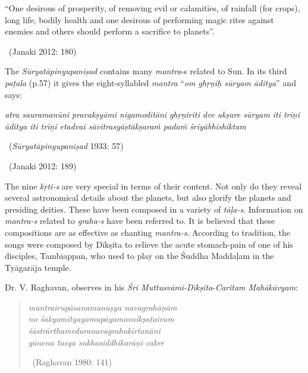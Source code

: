 \begin{myquote}
“One desirous of prosperity, of removing evil or calamities, of rainfall (for crops), long life, bodily health and one desirous of performing magic rites against enemies and others should perform a sacrifice to planets”.

~\hfill (Janaki 2012: 180)
\end{myquote}

The \textit{Sūryatāpinyupaniṣad} contains many \textit{mantra}-s related to Sun. In its third \textit{paṭala} (p.57) it gives the eight-syllabled \textit{mantra} “\textit{om ghṛṇiḥ sūryam āditya}” and says:

\begin{myquote}
\textit{atra sauramanūni pravakṣyāmi nigamoditāni  ghṛṇiriti dve akṣare  sūryam iti trīṇi  āditya iti trīṇi  etadvai sāvitrasyāṣtākṣaraṁ padaṁ śriyābhishiktam } 

~\hfill (\textit{Sūryatāpinyupaniṣad} 1933: 57)
\end{myquote}

\vspace{-.1cm}

\begin{myquote}

~\hfill (Janaki 2012: 189)
\end{myquote}

The nine \textit{kṛti-s} are very special in terms of their content. Not only do they reveal several astronomical details about the planets, but also glorify the planets and presiding deities. These have been composed in a variety of \textit{tāḷa-s}. Information on \textit{mantra-s} related to \textit{graha-s} have been referred to. It is believed that these compositions are as effective as chanting \textit{mantra-s}. According to tradition, the songs were composed by Dīkṣita to relieve the acute stomach-pain of one of his disciples, Tambiappan, who used to play on the Śuddha Maddaḷam in the Tyāgarāja temple.

Dr. V. Raghavan, observes in his \textit{Śri Muttusvāmi-Dīkṣita}-\textit{Caritam Mahā\-kāvyam}:

\vspace{-.2cm}

\begin{verse}
\textit{mantrairupāsanamanuṣya navagrahāṇām}\\\textit{no śakyamityayamupāyamavaikṣataivam} \\\textit{śāstrārthameduranavagrahakīrtanāni}\\\textit{gānena tasya sukhasiddhikarāṇi cakre}  

~\hfill (Raghavan 1980: 141)
\end{verse}


